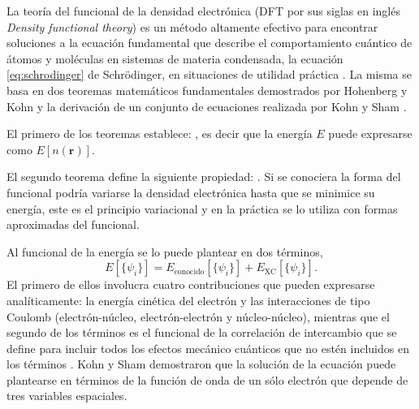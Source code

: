 La teoría del funcional de la densidad electrónica (DFT por sus siglas en inglés
\textit{Density functional theory}) es un método altamente efectivo para 
encontrar soluciones a la ecuación fundamental que describe el comportamiento 
cuántico de átomos y moléculas en sistemas de materia condensada, la ecuación 
\ref{eq:schrodinger} de Schrödinger, en situaciones de utilidad práctica 
\cite{sholl2022}. La misma se basa en dos teoremas matemáticos fundamentales
demostrados por Hohenberg y Kohn \cite{hohenberg1964} y la derivación de un 
conjunto de ecuaciones realizada por Kohn y Sham \cite{kohn1965}.

El primero de los teoremas establece: , es decir que la energía $E$ puede expresarse como 
$E[n(\mathbf{r})]$.

El segundo teorema define la siguiente propiedad: .
Si se conociera la forma del funcional  podría variarse la 
densidad electrónica hasta que se minimice su energía, este es el principio 
variacional y en la práctica se lo utiliza con formas aproximadas del funcional.

Al funcional de la energía se lo puede plantear en dos términos,
\begin{equation}
    E[\lbrace \psi_i \rbrace] = E_{\text{conocido}}[\lbrace \psi_i \rbrace] + E_{\text{XC}}[\lbrace \psi_i \rbrace].
\end{equation}
El primero de ellos involucra cuatro contribuciones que pueden expresarse 
analíticamente: la energía cinética del electrón y las interacciones de tipo 
Coulomb (electrón-núcleo, electrón-electrón y núcleo-núcleo), mientras que
el segundo de los términos es el funcional de la correlación de intercambio
que se define para incluir todos los efectos mecánico cuánticos que no estén
incluidos en los términos . Kohn y Sham demostraron que la 
solución de la ecuación puede plantearse en términos de la función de onda 
de un sólo electrón que depende de tres variables espaciales.

